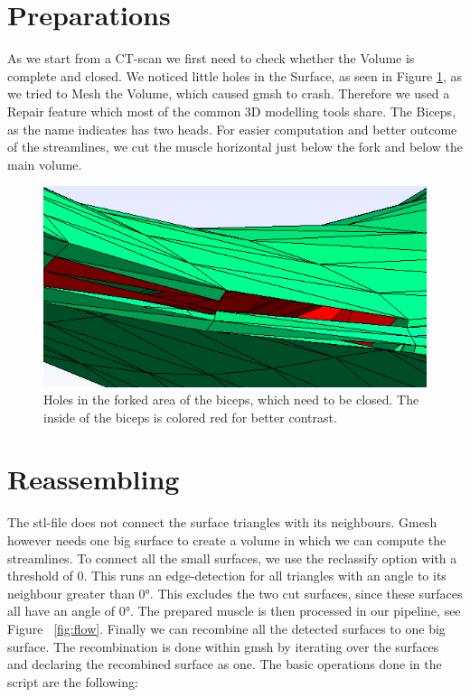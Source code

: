 \documentclass[preprint,journal]{vgtc}       %
\begin{document}
\section{Preparations}
As we start from a CT-scan we first need to check whether the Volume is complete and closed. We noticed little holes in the Surface, as seen  in Figure \ref{fig:holes}, as we tried to Mesh the Volume, which caused gmsh to crash. 
Therefore we used a Repair feature which most of the common 3D modelling tools share. 
The Biceps, as the name indicates has two heads. For easier computation and better outcome of the streamlines, we cut  the muscle horizontal just below the fork and below the main volume. 

\begin{figure}
	\begin{center}
		\includegraphics[width = .6\linewidth]{holes.png}
	\end{center}
	\caption{Holes in the forked area of the biceps, which need to be closed. The inside of the biceps is colored red for better contrast.}
	\label{fig:holes}
\end{figure}

\section{Reassembling}
The stl-file does not connect the surface triangles with its neighbours. Gmesh however needs one big surface to create a volume in which we can compute the streamlines. To connect all the small surfaces, we use the reclassify option with a threshold of 0. This runs an edge-detection for all triangles with an angle to its neighbour greater than \ang{0}. This excludes the two cut surfaces, since these surfaces all have an angle of \ang{0}. The prepared muscle is then processed in our pipeline, see Figure ~\ref{fig:flow}. Finally we can recombine all the detected surfaces to one big surface. The recombination is done within gmsh by iterating over the surfaces and declaring the recombined surface as one. The basic operations done in the script are the following:
\end{document}
